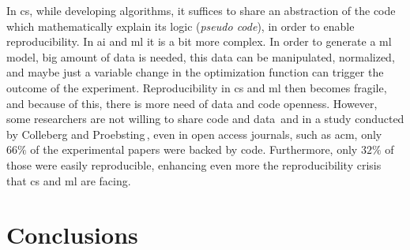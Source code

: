 In \ac{cs}, while developing algorithms, it suffices to share an abstraction of the code which
mathematically explain its logic (\emph{pseudo code}),
in order to enable reproducibility. In \ac{ai} and \ac{ml} it is a bit more complex. In order to
generate a \ac{ml} model, big amount of data is needed, 
this data can be manipulated, normalized, and maybe just a variable
change in the optimization function can trigger the outcome
of the experiment. Reproducibility in \ac{cs} and \ac{ml}
then becomes fragile, and because of this,
there is more need of data and code openness. However,
some researchers are not willing to share code and data\,\cite{gundersen2018state}
and in a study conducted by Colleberg and Proebsting\,\cite{Collberg:2016:RCS:2897191.2812803},
even in open access journals, such as \ac{acm}, only $66\%$ of the experimental papers
were backed by code. Furthermore, only $32\%$ of those were easily reproducible,
enhancing even more the reproducibility crisis that \ac{cs} and \ac{ml} are facing.

%



\section{Conclusions}




